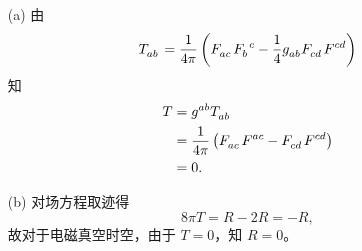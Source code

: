 \begin{xiti}
    \begin{zm}
        \begin{enumerate}
            \item[(a)] 由
            \begin{equation*}
                \tensor{T}{_a_b} = \frac{1}{4\pi} \left( \tensor{F}{_a_c} \tensor{F}{_b^c} - \frac{1}{4} \tensor{g}{_a_b} \tensor{F}{_c_d} \tensor{F}{^c^d} \right)
            \end{equation*}
            知
            \begin{equation*}
                \begin{split}
                    T &= \tensor{g}{^a^b} \tensor{T}{_a_b}\\
                    &= \frac{1}{4\pi} \left( \tensor{F}{_a_c} \tensor{F}{^a^c} - \tensor{F}{_c_d} \tensor{F}{^c^d} \right)\\
                    &= 0.
                \end{split}
            \end{equation*}
            \item[(b)] 对场方程取迹得
            \begin{equation*}
                8\pi T = R - 2 R = -R,
            \end{equation*}
            故对于电磁真空时空，由于 $T=0$，知 $R = 0$。
        \end{enumerate}
    \end{zm}
    
\end{xiti}
